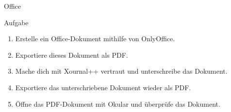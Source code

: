 \begin{frame}{Office}
    \vspace{0.5cm}
    \begin{alertblock}{Aufgabe}
        \pause
        \begin{enumerate}
            \item Erstelle ein Office-Dokument mithilfe von OnlyOffice.\pause
            \item Exportiere dieses Dokument als PDF.\pause
            \item Mache dich mit Xournal++ vertraut und unterschreibe das Dokument.\pause
            \item Exportiere das unterschriebene Dokument wieder als PDF.\pause
            \item Öffne das PDF-Dokument mit Okular und überprüfe das Dokument.
        \end{enumerate}
    \end{alertblock}
\end{frame}